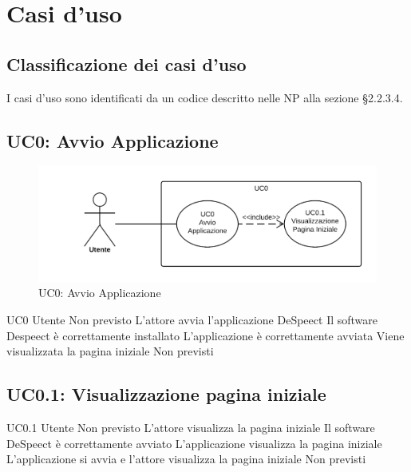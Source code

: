 \documentclass[../AnalisideiRequisiti.tex]{subfiles}
\begin{document}

	\chapter{Casi d'uso}
	\section{Classificazione dei casi d'uso}
	I casi d'uso sono identificati da un codice descritto nelle NP alla sezione §2.2.3.4. 
	
 	
	\section{UC0: Avvio Applicazione}
	\begin{figure}[H]
 
		\centering
 
		\includegraphics[width=\textwidth]{../img/UC0.png}
 
		\caption{UC0: Avvio Applicazione}
 
	\end{figure}
	\UserCase
	{UC0}
	{Utente}
	{Non previsto}
	{L'attore avvia l'applicazione DeSpeect}
	{Il software Despeect è correttamente installato}
	{L'applicazione è correttamente avviata}
	{Viene visualizzata la pagina iniziale }
	{Non previsti}
	
	\section{UC0.1: Visualizzazione pagina iniziale}
	\UserCase
	{UC0.1}
	{Utente}
	{Non previsto}
	{L'attore visualizza la pagina iniziale}
	{Il software DeSpeect è correttamente avviato }
	{L'applicazione visualizza la pagina iniziale}
	{L'applicazione si avvia e l'attore visualizza la pagina iniziale}
	{Non previsti}
	
\end{document}

